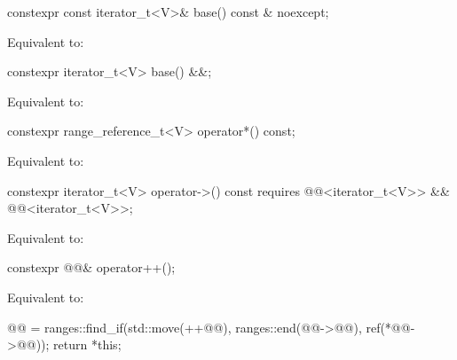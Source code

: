 %
\begin{itemdecl}
constexpr const iterator_t<V>& base() const & noexcept;
\end{itemdecl}

\begin{itemdescr}
\pnum
\effects
Equivalent to: 
\end{itemdescr}

%
\begin{itemdecl}
constexpr iterator_t<V> base() &&;
\end{itemdecl}

\begin{itemdescr}
\pnum
\effects
Equivalent to: 
\end{itemdescr}

%
\begin{itemdecl}
constexpr range_reference_t<V> operator*() const;
\end{itemdecl}

\begin{itemdescr}
\pnum
\effects
Equivalent to: 
\end{itemdescr}

%
\begin{itemdecl}
constexpr iterator_t<V> operator->() const
  requires @@<iterator_t<V>> && @@<iterator_t<V>>;
\end{itemdecl}

\begin{itemdescr}
\pnum
\effects
Equivalent to: 
\end{itemdescr}

%
\begin{itemdecl}
constexpr @@& operator++();
\end{itemdecl}

\begin{itemdescr}
\pnum
\effects
Equivalent to:
\begin{codeblock}
@@ = ranges::find_if(std::move(++@@), ranges::end(@@->@@),
                           ref(*@@->@@));
return *this;
\end{codeblock}
\end{itemdescr}

